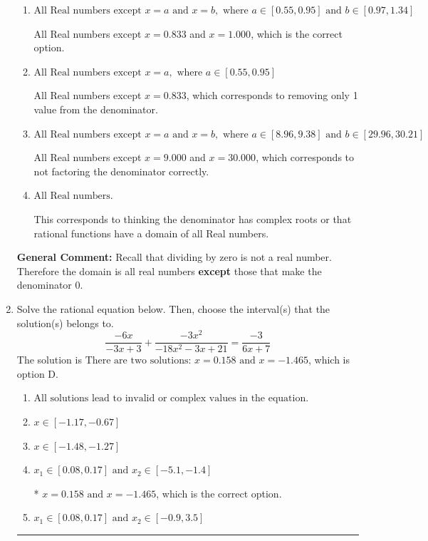 \documentclass{extbook}[14pt]
\newcommand{\litem}[1]{\item #1

\rule{\textwidth}{0.4pt}}
\begin{document}
\begin{enumerate}
{\begin{enumerate}[label=\Alph*.]
All Real numbers except $x = 9.000$, which corresponds to removing a distractor value from the denominator.
\item \( \text{All Real numbers except } x = a \text{ and } x = b, \text{ where } a \in [0.55, 0.95] \text{ and } b \in [0.97, 1.34] \)

All Real numbers except $x = 0.833$ and $x = 1.000$, which is the correct option.
\item \( \text{All Real numbers except } x = a, \text{ where } a \in [0.55, 0.95] \)

All Real numbers except $x = 0.833$, which corresponds to removing only 1 value from the denominator.
\item \( \text{All Real numbers except } x = a \text{ and } x = b, \text{ where } a \in [8.96, 9.38] \text{ and } b \in [29.96, 30.21] \)

All Real numbers except $x = 9.000$ and $x = 30.000$, which corresponds to not factoring the denominator correctly.
\item \( \text{All Real numbers.} \)

This corresponds to thinking the denominator has complex roots or that rational functions have a domain of all Real numbers.
\end{enumerate}

\textbf{General Comment:} Recall that dividing by zero is not a real number. Therefore the domain is all real numbers \textbf{except} those that make the denominator 0.
}
\litem{
Solve the rational equation below. Then, choose the interval(s) that the solution(s) belongs to.
\[ \frac{-6x}{-3x + 3} + \frac{-3x^{2}}{-18x^{2} -3 x + 21} = \frac{-3}{6x + 7} \]The solution is \( \text{There are two solutions: } x = 0.158 \text{ and } x = -1.465 \), which is option D.\begin{enumerate}[label=\Alph*.]
\item \( \text{All solutions lead to invalid or complex values in the equation.} \)


\item \( x \in [-1.17,-0.67] \)


\item \( x \in [-1.48,-1.27] \)


\item \( x_1 \in [0.08, 0.17] \text{ and } x_2 \in [-5.1,-1.4] \)

* $x = 0.158 \text{ and } x = -1.465$, which is the correct option.
\item \( x_1 \in [0.08, 0.17] \text{ and } x_2 \in [-0.9,3.5] \)



\end{enumerate}}
\end{enumerate}
\end{document}
